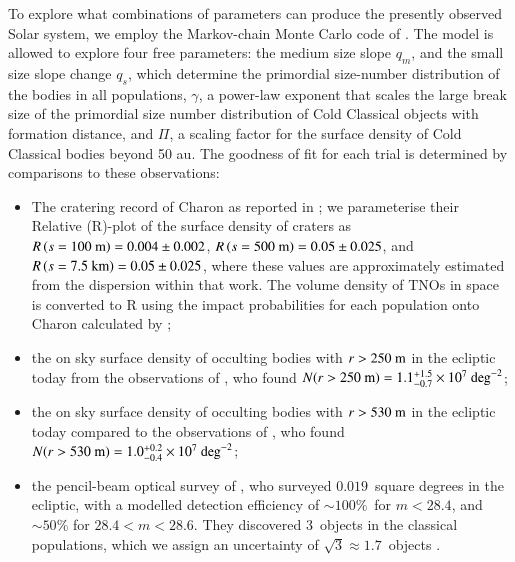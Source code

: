 \documentclass[printer]{aa}
\begin{document}
To explore what combinations of parameters can produce the presently observed Solar system, we employ the Markov-chain Monte Carlo code of \citet{2013PASP..125..306F}.  The model is allowed to explore four free parameters: the medium size slope $q_m$, and the small size slope change $q_s$, which determine the primordial size-number distribution of the bodies in all populations, $\gamma$, a power-law exponent that scales the large break size of the primordial size number distribution of Cold Classical objects with formation distance, and $\Pi$, a scaling factor for the surface density of Cold Classical bodies beyond 50 au.  The goodness of fit for each trial is determined by comparisons to these observations: 
\begin{itemize}
    \item The cratering record of Charon as reported in \citet{2019Sci...363..955S}; we parameterise their Relative (R)-plot of the surface density of craters as $R\left(s = 100~\rm{m}\right) = 0.004 \pm 0.002$, $R\left(s = 500~\rm{m}\right) = 0.05 \pm 0.025$, and $R\left(s = 7.5~\rm{km}\right) = 0.05 \pm 0.025$, where these values are approximately estimated from the dispersion within that work.  The volume density of TNOs in space is converted to R using the impact probabilities for each population onto Charon calculated by \citet{2015Icar..258..267G};
    \item the on sky surface density of occulting bodies with $r > 250~\rm{m}$ in the ecliptic today from the observations of \citet{2012ApJ...761..150S}, who found $N(r > 250~\rm{m})=1.1_{-0.7}^{+1.5} \times 10^7 \ \mathrm{deg}^{-2}$;
    \item the on sky surface density of occulting bodies with $r > 530~\rm{m}$ in the ecliptic today compared to the observations of \citet{2020submitted}, who found $N(r > 530~\rm{m})=1.0_{-0.4}^{+0.2} \times 10^7 \ \mathrm{deg}^{-2}$;
    \item the pencil-beam optical survey of \citet{2004AJ....128.1364B}, who surveyed $0.019$~square degrees in the ecliptic, with a modelled detection efficiency of $\sim 100\%$~for $m < 28.4$, and $\sim 50\%$ for $28.4 < m < 28.6$.  They discovered $3$~objects in the classical populations, which we assign an uncertainty of $\sqrt{3} \approx 1.7$~objects \citep{2006AJ....131.2364B}.
\end{itemize}
\end{document}
